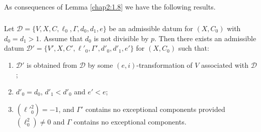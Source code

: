 \subsection{}\label{chap2:1.9}
As consequences of Lemma \ref{chap2:1.8} we have the following results.

\subsubsection{}\label{chap2:1.9.1}
\begin{coro*}
  Let $\mathscr{D}=\{V,X,C,\ell_{0},\Gamma,d_{0},d_{1},e\}$ be an
  admissible datum for $(X,C_{0})$ with $d_{0}=d_{1}>1$. Assume that
  $d_{0}$ is not divisible by $p$. Then there exists an admissible datum
  $\mathscr{D}'=\{V',X,C',\ell'_{0},\Gamma',d'_{0},d'_{1},e'\}$ for
  $(X,C_{0})$ such that:
  \begin{enumerate}
    \renewcommand{\labelenumi}{\rm(\theenumi)}
  \item $\mathscr{D}'$ is obtained from $\mathscr{D}$ by some
    $(e,i)$-transformation of $V$ associated with $\mathscr{D}$;
    
  \item $d'_{0}=d_{0}$, $d'_{1}<d'_{0}$ and $e'<e$;
    
  \item $({\ell'}^{2}_{0})=-1$, and $\Gamma'$ contains no exceptional
    components provided $(\ell^{2}_{0})\neq 0$ and $\Gamma$ contains no
    exceptional components.
  \end{enumerate}
\end{coro*}

